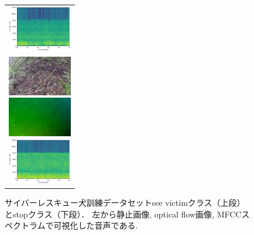 \documentclass[MIRU,submit]{miru2019j}
\begin{document}
\begin{figure}[tb]
\begin{tabular}{l}
      \begin{minipage}{0.32\hsize}
        \begin{center}
          \includegraphics[clip, width=2.8cm]{./Figures/sound_seevictim.eps}
        \end{center}
      \end{minipage}
\\  %
      \begin{minipage}{0.32\hsize}
        \begin{center}
          \includegraphics[clip, width=2.8cm]{./Figures/still_stop1-3.eps}
        \end{center}
      \end{minipage}
      \begin{minipage}{0.32\hsize}
        \begin{center}
          \includegraphics[clip, width=2.8cm]{./Figures/optic_stop1-3.eps}
        \end{center}
      \end{minipage}
      \begin{minipage}{0.32\hsize}
        \begin{center}
          \includegraphics[clip, width=2.8cm]{./Figures/sound_stop2.eps}
        \end{center}
      \end{minipage}
    \end{tabular}
    \caption{サイバーレスキュー犬訓練データセットsee victimクラス（上段）とstopクラス（下段）． 左から静止画像, optical flow画像, MFCCスペクトラムで可視化した音声である.}
    \label{dataset}
\end{figure}
\end{document}

